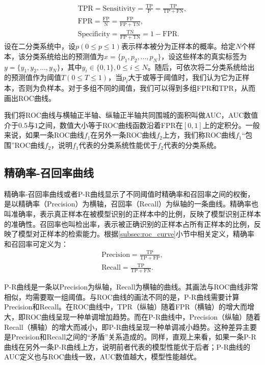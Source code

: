 \begin{gather}
	\mathrm{TPR}=\mathrm{Sensitivity}=\frac{\mathrm{TP}}{\mathrm{P}}=\frac{\mathrm{TP}}{\mathrm{TP}+\mathrm{FN}},\\
	\mathrm{FPR}=\frac{\mathrm{FP}}{\mathrm{N}}=\frac{\mathrm{FP}}{\mathrm{FP}+\mathrm{TN}},\\
	\mathrm{Specificity}=\frac{\mathrm{TN}}{\mathrm{FP}+\mathrm{TN}}=1-\mathrm{FPR}.
\end{gather}
设在二分类系统中，设$p(0\leq p \leq 1)$表示样本被分为正样本的概率。给定$N$个样本，该分类系统给出的预测值为$x=\{p_1,p_2,...,p_N
\}$，设这些样本的真实标签为$y=\{y_1,y_2,...,y_N\}$，其中$y_i \in \{0,1\},0\leq i \le N$。随后，可依次将二分类系统给出的预测值作为阈值$T(0\leq T \leq 1)$，当$p_i$大于或等于阈值时，我们认为它为正样本，否则为负样本。对于多组不同的阈值，我们可以得到多组FPR和TPR，从而画出ROC曲线。

我们将ROC曲线与横轴正半轴、纵轴正半轴共同围城的面积叫做AUC，AUC数值介于$0.5$与$1$之间，数值大小等于ROC曲线函数沿着FPR在$[0,1]$上的定积分。一般来说，如果一条ROC曲线$f_1$在另外一条ROC曲线$f_2$上方，我们称ROC曲线$f_1$“包围”ROC曲线$f_2$，说明$f_1$代表的分类系统性能优于$f_2$代表的分类系统。
\subsection{精确率-召回率曲线}\label{subsec:pr_curve}
精确率-召回率曲线或者P-R曲线显示了不同阈值时精确率和召回率之间的权衡，是以精确率（Precision）为横轴，召回率（Recall）为纵轴的一条曲线。精确率也叫准确率，表示真正样本在被模型识别的正样本中的比例，反映了模型识别正样本的准确性。召回率也叫检出率，表示被正确识别的正样本占所有正样本的比例，反映了模型对正样本的检索能力。根据\ref{subsec:roc_curve}小节中相关定义，精确率和召回率可定义为：
\begin{gather}
	\mathrm{Precision}=\frac{\mathrm{TP}}{\mathrm{TP}+\mathrm{FP}},\\
	\mathrm{Recall}=\frac{\mathrm{TP}}{\mathrm{TP}+\mathrm{FN}}.
\end{gather}


P-R曲线是一条以Precision为纵轴，Recall为横轴的曲线。其画法与ROC曲线非常相似，均需要取一组阈值。与ROC曲线的画法不同的是，P-R曲线需要计算Precision和Recall。在ROC曲线中，TPR（纵轴）随着FPR（横轴）的增大而增大，即ROC曲线呈现一种单调增加趋势。而在P-R曲线中，Precision（纵轴）随着Recall（横轴）的增大而减小，即P-R曲线呈现一种单调减小趋势。这种差异主要是Precision和Recall之间的“矛盾”关系造成的。同样，直观上来看，如果一条P-R曲线在另外一条P-R曲线上方，说明前者代表的模型性能优于后者；P-R曲线的AUC定义也与ROC曲线一致，AUC数值越大，模型性能越优。

